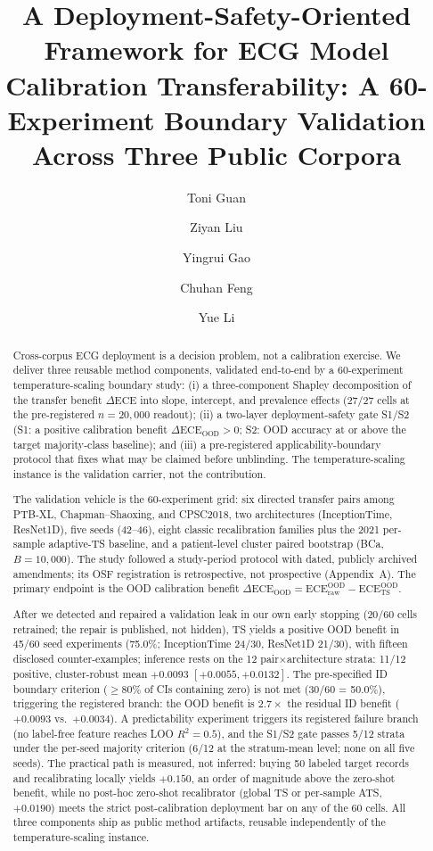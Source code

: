 \documentclass[final,5p,times,nonatbib]{elsarticle}
\title{A Deployment-Safety-Oriented Framework for ECG Model
Calibration Transferability: A 60-Experiment Boundary Validation
Across Three Public Corpora}
\author[inst1]{Toni Guan\corref{cor1}}
\author[inst1]{Ziyan Liu}
\author[inst1]{Yingrui Gao}
\author[inst1]{Chuhan Feng}
\author[inst1]{Yue Li}
\affiliation[inst1]{organization={College of Information Technology, Shenyang Institute of Technology},
  city={Shenyang}, state={Liaoning}, country={China}}
\begin{document}
\begin{frontmatter}

\begin{abstract}
\noindent Cross-corpus ECG deployment is a decision
problem, not a calibration exercise. We deliver three reusable method
components, validated end-to-end by a 60-experiment temperature-scaling
boundary study: (i) a three-component Shapley decomposition of the
transfer benefit $\Delta\text{ECE}$ into slope, intercept, and
prevalence effects (27/27 cells at the pre-registered $n=20{,}000$
readout); (ii) a two-layer deployment-safety gate S1/S2 (S1: a positive
calibration benefit $\Delta\text{ECE}_{\text{OOD}}>0$; S2: OOD accuracy
at or above the target majority-class baseline); and (iii) a
pre-registered applicability-boundary protocol that fixes what may be
claimed before unblinding. The temperature-scaling instance is the
validation carrier, not the contribution.

The validation vehicle is the 60-experiment grid: six directed transfer
pairs among PTB-XL, Chapman--Shaoxing, and CPSC2018, two architectures
(InceptionTime, ResNet1D), five seeds (42--46), eight classic
recalibration families plus the 2021 per-sample adaptive-TS baseline,
and a patient-level cluster paired bootstrap (BCa, $B=10{,}000$). The
study followed a study-period protocol with dated, publicly archived
amendments; its OSF registration is retrospective, not prospective
(Appendix~A). The primary endpoint is the OOD calibration benefit
$\Delta\text{ECE}_{\text{OOD}}=\text{ECE}_{\mathrm{raw}}^{\mathrm{OOD}}
-\text{ECE}_{\mathrm{TS}}^{\mathrm{OOD}}$.

After we detected and repaired a validation leak in our own early
stopping (20/60 cells retrained; the repair is published, not hidden),
TS yields a positive OOD benefit in 45/60 seed experiments (75.0\%;
InceptionTime 24/30, ResNet1D 21/30), with fifteen disclosed
counter-examples; inference rests on the 12 pair$\times$architecture
strata: 11/12 positive, cluster-robust mean $+0.0093$
$[+0.0055,+0.0132]$. The pre-specified ID boundary criterion
($\geq$80\% of CIs containing zero) is not met (30/60 = 50.0\%),
triggering the registered branch: the OOD benefit is $2.7\times$ the
residual ID benefit ($+0.0093$ vs.\ $+0.0034$). A predictability
experiment triggers its registered failure branch (no label-free
feature reaches LOO $R^2=0.5$), and the S1/S2 gate passes 5/12 strata
under the per-seed majority criterion (6/12 at the stratum-mean level;
none on all five seeds). The practical path is measured, not inferred: buying 50
labeled target records and recalibrating locally yields $+0.150$, an
order of magnitude above the zero-shot benefit, while no post-hoc
zero-shot recalibrator (global TS or per-sample ATS, $+0.0190$) meets
the strict post-calibration deployment bar on any of the 60 cells. All
three components ship as public method artifacts, reusable
independently of the temperature-scaling instance.
\end{abstract}


\end{frontmatter}
\end{document}
